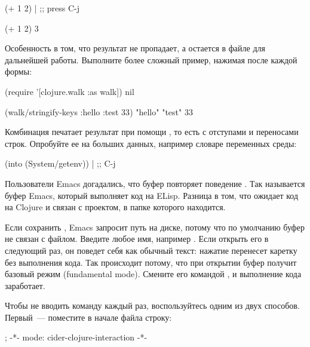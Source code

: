 \begin{english}
  \begin{clojure}
(+ 1 2) | ;; press C-j

(+ 1 2)
3
  \end{clojure}
\end{english}

Особенность  в том, что результат не пропадает, а остается в файле для дальнейшей работы. Выполните более сложный пример, нажимая  после каждой формы:

\begin{english}
  \begin{clojure}
(require '[clojure.walk :as walk])
nil

(walk/stringify-keys {:hello {:test 33}})
{"hello" {"test" 33}}
  \end{clojure}
\end{english}

Комбинация  печатает результат при помощи , то есть с отступами и переносами строк. Опробуйте ее на больших данных, например словаре переменных среды:

\begin{english}
  \begin{clojure}
(into {} (System/getenv)) | ;; C-j
  \end{clojure}
\end{english}

Пользователи Emacs догадались, что буфер  повторяет поведение . Так называется буфер Emacs, который выполняет код на ELisp. Разница в том, что  ожидает код на Clojure и связан с проектом, в папке которого находится.

Если сохранить , Emacs запросит путь на диске, потому что по умолчанию буфер не связан с файлом. Введите любое имя, например . Если открыть его в следующий раз, он поведет себя как обычный текст: нажатие  перенесет каретку без выполнения кода. Так происходит потому, что при открытии буфер получит базовый режим (fundamental mode). Смените его командой , и выполнение кода заработает.

Чтобы не вводить команду каждый раз, воспользуйтесь одним из двух способов. Первый~--- поместите в начале файла строку:

\begin{english}
  \begin{text}
; -*- mode: cider-clojure-interaction -*-
  \end{text}
\end{english}

